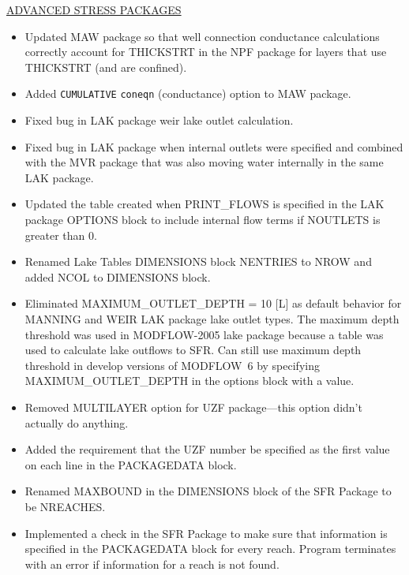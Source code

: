 	\underline{ADVANCED STRESS PACKAGES}
	\begin{itemize}
		\item Updated MAW package so that well connection conductance calculations correctly account for THICKSTRT in the NPF package for layers that use THICKSTRT (and are confined).
		\item Added \texttt{CUMULATIVE} \texttt{coneqn} (conductance) option to MAW package.
		\item Fixed bug in LAK package weir lake outlet calculation.
		\item Fixed bug in LAK package when internal outlets were specified and combined with the MVR package that was also moving water internally in the same LAK package.
		\item Updated the table created when PRINT\_FLOWS is specified in the LAK package OPTIONS block to include internal flow terms if NOUTLETS is greater than 0. 
		\item Renamed Lake Tables DIMENSIONS block NENTRIES to NROW and added NCOL to DIMENSIONS block.
		\item Eliminated MAXIMUM\_OUTLET\_DEPTH = 10 [L] as default behavior for MANNING and WEIR LAK package lake outlet types. The maximum depth threshold was used in MODFLOW-2005 lake package because a table was used to calculate lake outflows to SFR. Can still use maximum depth threshold in develop versions of MODFLOW~6 by specifying MAXIMUM\_OUTLET\_DEPTH in the options block with a value.
		\item Removed MULTILAYER option for UZF package---this option didn't actually do anything.
		\item Added the requirement that the UZF number be specified as the first value on each line in the PACKAGEDATA block.
		\item Renamed MAXBOUND in the DIMENSIONS block of the SFR Package to be NREACHES.
		\item Implemented a check in the SFR Package to make sure that information is specified in the PACKAGEDATA block for every reach.  Program terminates with an error if information for a reach is not found.
	\end{itemize}
	